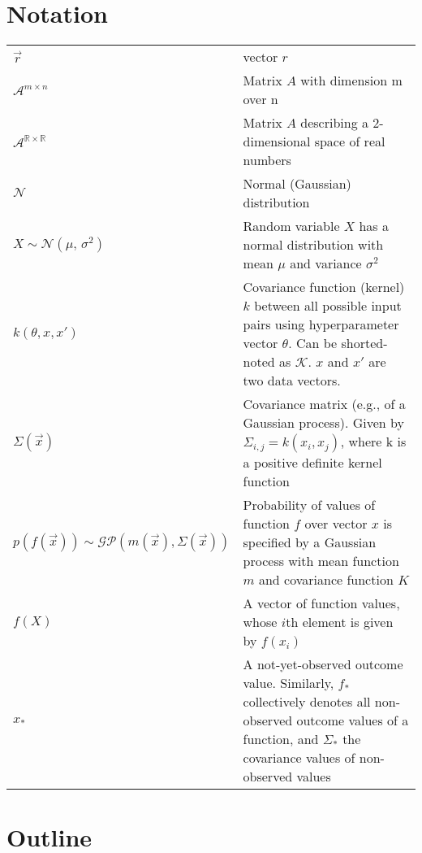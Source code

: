 \section*{Notation}
\begin{tabularx}{\linewidth}{l@{\quad}X}
	$\vec{r}$ & vector $r$ \\
	$\mathcal{A}^{m \times n}$ & Matrix $A$ with dimension m over n \\
	$\mathcal{A}^{\mathbb{R} \times \mathbb{R}}$ & Matrix $A$ describing a 2-dimensional space of real numbers \\
	$\mathcal{N}$ 	&	Normal (Gaussian) distribution \\
	$X \sim \mathcal{N}(\mu,\,\sigma^{2})$	&	Random variable $X$ has a normal distribution with mean $\mu$ and variance $\sigma^{2}$ \\
	$k\left( \theta, x, x' \right)$ & Covariance function (kernel) $k$ between all possible input pairs using hyperparameter vector $\theta$. Can be shorted-noted as $\mathcal{K}$. $x$ and $x'$ are two data vectors. \\
	$\Sigma(\vec{x})$	&	Covariance matrix (e.g., of a Gaussian process). Given by $\Sigma_{i,j} = k(x_i, x_j)$, where k is a positive definite kernel function \\
	$p\left( f \left( \vec{x} \right) \right) \sim \mathcal{GP}\left( m(\vec{x}), \Sigma(\vec{x}) \right)$	&	Probability of values of function $f$ over vector $x$ is specified by a Gaussian process with mean function $m$ and covariance function $K$ \\
	$f(X)$	&	A vector of function values, whose $i$th element is given by $f(x_i)$ \\
	$x_*$	&	A not-yet-observed outcome value. Similarly, $f_*$ collectively denotes all non-observed outcome values of a function, and $\Sigma_*$ the covariance values of non-observed values \\
\end{tabularx}
  	
\newpage
\section*{Outline}
